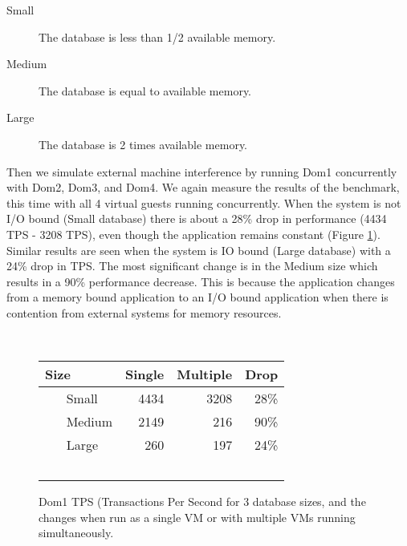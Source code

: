 \begin{description}
  \item[Small] The database is less than 1/2 available memory.
  \item[Medium] The database is equal to available memory.
  \item[Large] The database is 2 times available memory.
\end{description}

Then we simulate external machine interference by running Dom1 concurrently with Dom2, Dom3, and Dom4.  We again measure the results of the benchmark, this time with all 4 virtual guests running concurrently.  When the system is not I/O bound (Small database) there is about a 28\% drop in performance (4434 TPS - 3208 TPS), even though the application remains constant (Figure \ref{fig:tps1}).
Similar results are seen when the system is IO bound (Large database) with a 24\% drop in TPS.  The most significant change is in the Medium size which results in a 90\% performance decrease.  This is because the application changes from a memory bound application to an I/O bound application when there is contention from external systems for memory resources.  

\begin{figure}
  \begin{tabular}{ l | r | r | r }
    Size & Single & Multiple & Drop \\
    \hline
    Small & 4434 & 3208 & 28\% \\ \hline
    Medium & 2149 & 216 & 90\% \\ \hline
    Large & 260 & 197 & 24\% \\  \hline
  \end{tabular}
\caption{Dom1 TPS (Transactions Per Second for 3 database sizes, and the changes when run as a single VM or with multiple VMs running simultaneously.}
\label{fig:tps1}
\end{figure}

